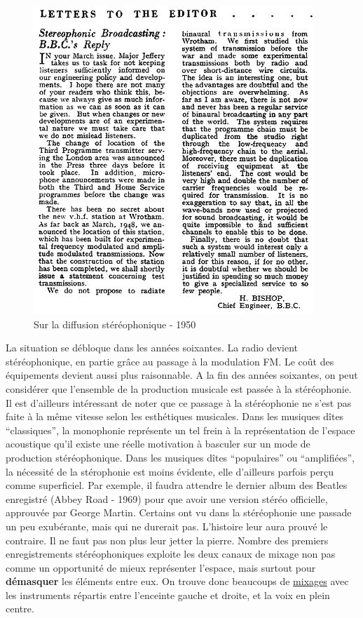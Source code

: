 \documentclass[
  letterpaper,
  DIV=11,
  numbers=noendperiod]{scrreprt}
\begin{document}
\begin{figure}

{\centering \includegraphics{spatialisation/../_resources/bitmap/various/WW1950.jpg}

}

\caption{Sur la diffusion stéréophonique - 1950}

\end{figure}

La situation se débloque dans les années soixantes. La radio devient
stéréophonique, en partie grâce au passage à la modulation FM. Le coût
des équipements devient aussi plus raisonnable. A la fin des années
soixantes, on peut considérer que l'ensemble de la production musicale
est passée à la stéréophonie. Il est d'ailleurs intéressant de noter que
ce passage à la stéréophonie ne s'est pas faite à la même vitesse selon
les esthétiques musicales. Dans les musiques dîtes ``classiques'', la
monophonie représente un tel frein à la représentation de l'espace
acoustique qu'il existe une réelle motivation à basculer sur un mode de
production stéréophonique. Dans les musiques dîtes ``populaires'' ou
``amplifiées'', la nécessité de la stérophonie est moins évidente, elle
d'ailleurs parfois perçu comme superficiel. Par exemple, il faudra
attendre le dernier album des Beatles enregistré (Abbey Road - 1969)
pour que avoir une version stéréo officielle, approuvée par George
Martin. Certains ont vu dans la stéréophonie une passade un peu
exubérante, mais qui ne durerait pas. L'histoire leur aura prouvé le
contraire. Il ne faut pas non plus leur jetter la pierre. Nombre des
premiers enregistrements stéréophoniques exploite les deux canaux de
mixage non pas comme un opportunité de mieux représenter l'espace, mais
surtout pour \textbf{démasquer} les éléments entre eux. On trouve donc
beaucoups de \href{https://www.youtube.com/watch?v=213W-8t9MLQ}{mixages}
avec les instruments répartis entre l'enceinte gauche et droite, et la
voix en plein centre.
\end{document}
